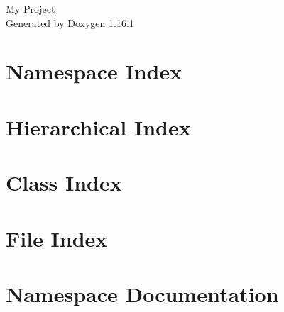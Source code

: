 \documentclass[twoside]{book}
\newcommand{\+}{\discretionary{\mbox{\scriptsize$\hookleftarrow$}}{}{}}
\newcommand{\clearemptydoublepage}{%
    \newpage{\pagestyle{empty}\cleardoublepage}%
  }
\begin{document}
  \raggedbottom
    \hypersetup{pageanchor=false,
                bookmarksnumbered=true,
                pdfencoding=unicode
               }
  \begin{titlepage}
  \vspace*{7cm}
  \begin{center}%
  {\Large My Project}\\
  \vspace*{1cm}
  {\large Generated by Doxygen 1.16.1}\\
  \end{center}
  \end{titlepage}
  \clearemptydoublepage
  \tableofcontents
  \clearemptydoublepage
  \hypersetup{pageanchor=true}
\chapter{Namespace Index}

\chapter{Hierarchical Index}

\chapter{Class Index}

\chapter{File Index}

\chapter{Namespace Documentation}


\end{document}
